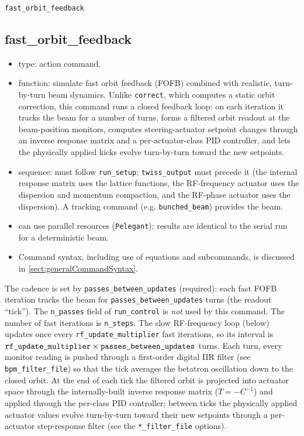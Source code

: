 \documentclass[11pt]{article}
\begin{document}
\newpage
\begin{center}{\Large\verb|fast_orbit_feedback|}\end{center}
\subsection{fast\_orbit\_feedback \label{subsec:fastorbitfeedback}}

\begin{itemize}
\item type: action command.
\item function: simulate fast orbit feedback (FOFB) combined with realistic,
  turn-by-turn beam dynamics.  Unlike \verb|correct|, which computes a static orbit
  correction, this command runs a closed feedback loop: on each iteration it tracks the
  beam for a number of turns, forms a filtered orbit readout at the beam-position
  monitors, computes steering-actuator setpoint changes through an inverse response
  matrix and a per-actuator-class PID controller, and lets the physically applied kicks
  evolve turn-by-turn toward the new setpoints.
\item sequence: must follow \verb|run_setup|; \verb|twiss_output| must precede it (the
  internal response matrix uses the lattice functions, the RF-frequency actuator uses
  the dispersion and momentum compaction, and the RF-phase actuator uses the dispersion).  A
  tracking command (e.g. \verb|bunched_beam|)
  provides the beam.
\item can use parallel resources (\verb|Pelegant|); results are identical to the serial
  run for a deterministic beam.
\item Command syntax, including use of equations and subcommands, is discussed in \ref{sect:generalCommandSyntax}.
\end{itemize}

The cadence is set by \verb|passes_between_updates| (required): each fast FOFB iteration
tracks the beam for \verb|passes_between_updates| turns (the readout ``tick'').  The
\verb|n_passes| field of \verb|run_control| is \emph{not} used by this command.  The number
of fast iterations is \verb|n_steps|.  The slow RF-frequency loop (below) updates once every
\verb|rf_update_multiplier| fast iterations, so its interval is
$\verb|rf_update_multiplier|\times\verb|passes_between_updates|$ turns.  Each turn, every
monitor reading is pushed through a first-order digital IIR filter (see
\verb|bpm_filter_file|) so that the tick averages the betatron oscillation down to the closed
orbit.  At the end of each tick the filtered orbit is projected into actuator space through
the internally-built inverse response matrix ($T=-C^{-1}$) and applied through the per-class
PID controller; between ticks the physically applied actuator values evolve turn-by-turn
toward their new setpoints through a per-actuator step-response filter (see the
\verb|*_filter_file| options).
\end{document}
